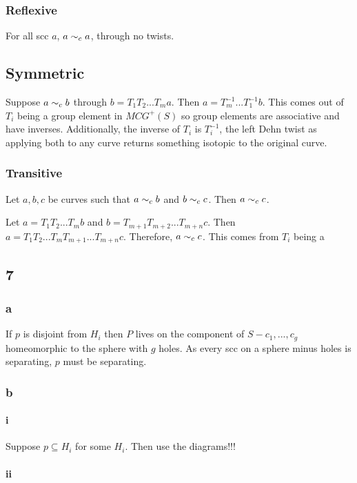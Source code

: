 \documentclass{article}
\theoremstyle{definition}
\numberwithin{theorem}{section}
\numberwithin{equation}{section}
\begin{document}
\subsubsection{Reflexive}
For all scc $a$, $a \sim_c a$, through no twists.

\subsection{Symmetric}
Suppose $a \sim_c b$ through $b = T_1 T_2 ... T_m a$. Then $a = T_m^{-1} ... T_1^{-1}b$. This comes out of $T_i$ being a group element in $MCG^+(S)$ so group elements are associative and have inverses. Additionally, the inverse of $T_i$ is $T_i^{-1}$, the left Dehn twist as applying both to any curve returns something isotopic to the original curve. 

\subsubsection{Transitive}
Let $a, b, c$ be curves such that $a \sim_c b$ and $b \sim_c c$. Then $a \sim_c c$. 

Let $a = T_1 T_2 ... T_m b$ and $b = T_{m + 1} T_{m + 2}... T_{m + n} c$. Then $a = T_1 T_2 ... T_m T_{m + 1} ... T_{m + n} c$. Therefore, $a \sim_c c$. This comes from $T_i$ being a 

\subsection{7}

\subsubsection{a}
If $p$ is disjoint from $H_i$ then $P$ lives on the component of $S - c_1, ..., c_g$ homeomorphic to the sphere with $g$ holes. As every scc on a sphere minus holes is separating, $p$ must be separating. 

\subsubsection{b}
\paragraph*{i}
Suppose $p \subseteq H_i$ for some $H_i$. Then use the diagrams!!!


\paragraph*{ii}
\end{document}
